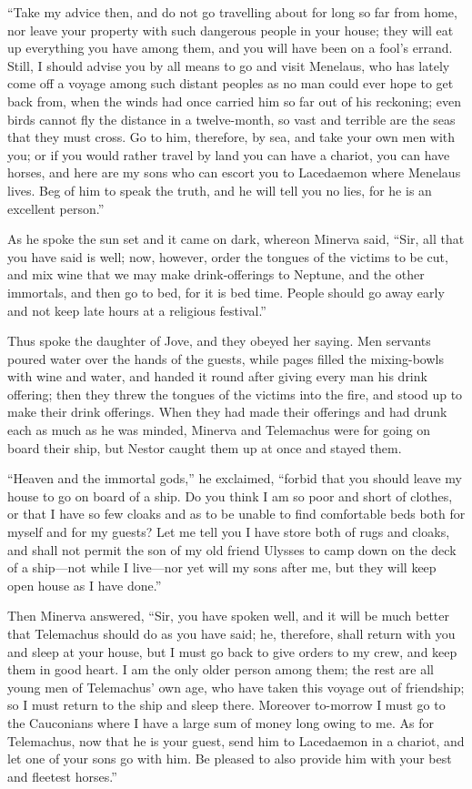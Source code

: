 “Take my advice then, and do not go travelling about for long so far from home,
nor leave your property with such dangerous people in your house; they will eat
up everything you have among them, and you will have been on a fool’s errand.
Still, I should advise you by all means to go and visit Menelaus, who has
lately come off a voyage among such distant peoples as no man could ever hope
to get back from, when the winds had once carried him so far out of his
reckoning; even birds cannot fly the distance in a twelve-month, so vast and
terrible are the seas that they must cross. Go to him, therefore, by sea, and
take your own men with you; or if you would rather travel by land you can have
a chariot, you can have horses, and here are my sons who can escort you to
Lacedaemon where Menelaus lives. Beg of him to speak the truth, and he will
tell you no lies, for he is an excellent person.”

As he spoke the sun set and it came on dark, whereon Minerva said, “Sir, all
that you have said is well; now, however, order the tongues of the victims to
be cut, and mix wine that we may make drink-offerings to Neptune, and the other
immortals, and then go to bed, for it is bed time. People should go away early
and not keep late hours at a religious festival.”

Thus spoke the daughter of Jove, and they obeyed her saying. Men servants
poured water over the hands of the guests, while pages filled the mixing-bowls
with wine and water, and handed it round after giving every man his drink
offering; then they threw the tongues of the victims into the fire, and stood
up to make their drink offerings. When they had made their offerings and had
drunk each as much as he was minded, Minerva and Telemachus were for going on
board their ship, but Nestor caught them up at once and stayed them.

“Heaven and the immortal gods,” he exclaimed, “forbid that you should leave my
house to go on board of a ship. Do you think I am so poor and short of clothes,
or that I have so few cloaks and as to be unable to find comfortable beds both
for myself and for my guests? Let me tell you I have store both of rugs and
cloaks, and shall not permit the son of my old friend Ulysses to camp down on
the deck of a ship—not while I live—nor yet will my sons after me, but they
will keep open house as I have done.”

Then Minerva answered, “Sir, you have spoken well, and it will be much better
that Telemachus should do as you have said; he, therefore, shall return with
you and sleep at your house, but I must go back to give orders to my crew, and
keep them in good heart. I am the only older person among them; the rest are
all young men of Telemachus’ own age, who have taken this voyage out of
friendship; so I must return to the ship and sleep there. Moreover to-morrow I
must go to the Cauconians where I have a large sum of money long owing to me.
As for Telemachus, now that he is your guest, send him to Lacedaemon in a
chariot, and let one of your sons go with him. Be pleased to also provide him
with your best and fleetest horses.”

